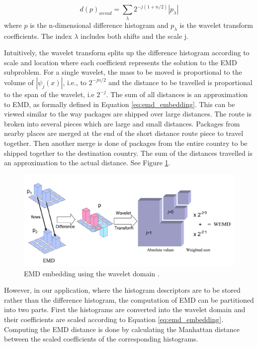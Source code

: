 \begin{equation}
d(p)_{wemd}= \sum\limits_{\lambda} 2^{-j(1+n/2)}|p_{\lambda}|
\label{eq:emd_embedding}
\end{equation}
where $p$ is the n-dimensional difference histogram and $p_{\lambda}$ is the wavelet transform coefficients. 
The index $\lambda$ includes both shifts and the scale j.

\iftoggle{edit-mode}{\hspace{0pt}\marginpar{Intuitive explanation}}{}
Intuitively, the wavelet transform splits up the difference histogram according to scale and location where each coefficient represents the solution to the EMD subproblem. 
For a single wavelet, the mass to be moved is proportional to the volume of $|\psi_j(x)|$, i.e., to $2^{-jn/2}$ and the distance to be travelled is proportional to the span of the wavelet, i.e $2^{-j}$. 
The sum of all distances is an approximation to EMD, as formally defined in Equation \ref{eq:emd_embedding}. 
This can be viewed similar to the way packages are shipped over large distances. 
The route is broken into several pieces which are large and small distances. 
Packages from nearby places are merged at the end of the short distance route piece to travel together. 
Then another merge is done of packages from the entire country to be shipped together to the destination country. 
The sum of the distances travelled is an approximation to the actual distance. 
See Figure \ref{fig:emd_wavelet}.

\begin{figure}
\centering
\includegraphics[width=1\textwidth]{./figures/emd_wavelet}       
\caption{EMD embedding using the wavelet domain \cite{shirdhonkar2008approximate}.}
\label{fig:emd_wavelet} 
\end{figure}

\iftoggle{edit-mode}{\hspace{0pt}\marginpar{Embedding the histograms rather than the difference histogram}}{}
However, in our application, where the histogram descriptors are to be stored rather than the difference histogram, the computation of EMD can be partitioned into two parts. 
First the histograms are converted into the wavelet domain and their coefficients are scaled according to Equation \ref{eq:emd_embedding}. 
Computing the EMD distance is done by calculating the Manhattan distance between the scaled coefficients of the corresponding histograms.

